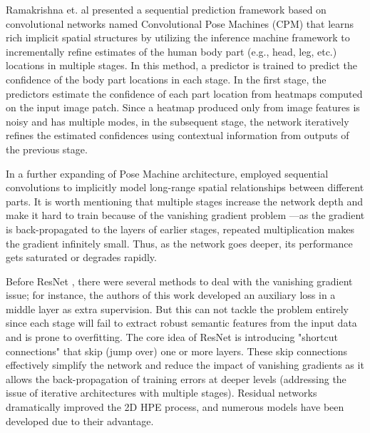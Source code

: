 Ramakrishna et. al \cite{ramakrishna_pose_2014} presented a sequential prediction framework based on convolutional networks named Convolutional Pose Machines (CPM) that learns rich implicit spatial structures by utilizing the inference machine framework to incrementally refine estimates of the human body part (e.g., head, leg, etc.) locations in multiple stages. In this method, a predictor is trained to predict the confidence of the body part locations in each stage. In the first stage, the predictors estimate the confidence of each part location from heatmaps computed on the input image patch. Since a heatmap produced only from image features is noisy and has multiple modes, in the subsequent stage, the network iteratively refines the estimated confidences using contextual information from outputs of the previous stage. 

In a further expanding of Pose Machine architecture, \cite{wei_convolutional_2016} employed sequential convolutions to implicitly model long-range spatial relationships between different parts. It is worth mentioning that multiple stages increase the network depth and make it hard to train because of the vanishing gradient problem ---as the gradient is back-propagated to the layers of earlier stages, repeated multiplication makes the gradient infinitely small. Thus, as the network goes deeper, its performance gets saturated or degrades rapidly. 

Before ResNet \cite{he_deep_2016}, there were several methods to deal with the vanishing gradient issue; for instance, the authors of this work \cite{wei_convolutional_2016} developed an auxiliary loss in a middle layer as extra supervision. But this can not tackle the problem entirely since each stage will fail to extract robust semantic features from the input data and is prone to overfitting. The core idea of ResNet is introducing "shortcut connections" that skip (jump over) one or more layers. These skip connections effectively simplify the network and reduce the impact of vanishing gradients as it allows the back-propagation of training errors at deeper levels (addressing the issue of iterative architectures with multiple stages). Residual networks dramatically improved the 2D HPE process, and numerous models \cite{vedaldi_learning_2020, chen_cascaded_2018, ke_multi-scale_2018, liu_cascaded_2018, chu_multi-context_2017, newell_stacked_2016, su_multi-person_2019, sun_deep_2019, yang_learning_2017} have been developed due to their advantage. 

